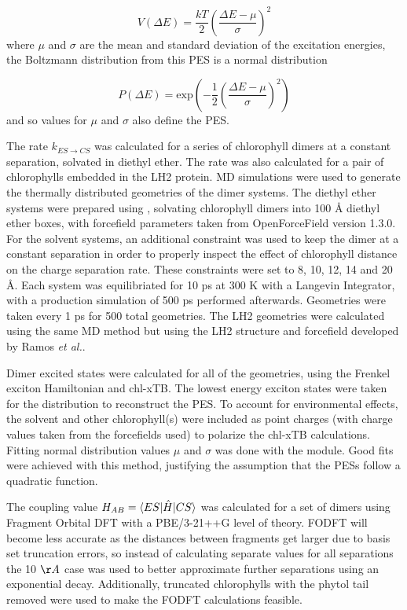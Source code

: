 \begin{equation}
    V\left(\Delta E\right) = \frac{kT}{2} \left( \frac{\Delta E - \mu}{\sigma}\right)^2
\end{equation}
%
where $\mu$ and $\sigma$ are the mean and standard deviation of the excitation energies,
the Boltzmann distribution from this PES is a normal distribution

\begin{equation}
    P\left(\Delta E\right) = \text{exp} \left(-\frac{1}{2}\left(\frac{\Delta E - \mu}{\sigma}\right)^2\right)
\end{equation}
%
and so values for $\mu$ and $\sigma$ also define the PES. 

The rate $k_{ES \rightarrow CS}$ was calculated for a series of chlorophyll dimers 
at a constant separation, solvated in diethyl ether. The rate was also calculated 
for a pair of chlorophylls embedded in the LH2 protein. MD simulations were used 
to generate  the thermally distributed geometries of the dimer systems. The diethyl
ether systems were prepared using , solvating chlorophyll dimers into 
100 \AA{} diethyl ether boxes, with forcefield parameters taken from OpenForceField 
version 1.3.0. For the solvent systems, an additional constraint was used to keep 
the dimer at a constant separation in order to properly inspect the effect of chlorophyll
distance on the charge separation rate. These constraints were set to 8, 10, 12,
14 and 20 \AA{}. Each system was equilibriated for 10 ps at 300 K with a
Langevin Integrator, with a production simulation of 500 ps performed afterwards. 
Geometries were taken every 1 ps for 500 total geometries. The LH2 geometries were
calculated using the same MD method but using the LH2 structure and forcefield developed
by Ramos \emph{et al.}.

Dimer excited states were calculated for all of the geometries, using the Frenkel
exciton Hamiltonian and chl-xTB. The lowest energy exciton states were taken for 
the distribution to reconstruct the PES. To account for environmental effects, the
solvent and other chlorophyll(s) were included as point charges (with charge values 
taken from the forcefields used) to polarize the chl-xTB calculations. Fitting normal
distribution values $\mu$ and $\sigma$ was done with the  module.
Good fits were achieved with this method, justifying the assumption that the PESs
follow a quadratic function.

The coupling value $H_{AB} = \braket{ES|\hat{H}|CS}$ was calculated for a set of
dimers using Fragment Orbital DFT with a PBE/3-21++G level of theory. FODFT will
become less accurate as the distances between fragments get larger due to basis
set truncation errors, so instead of calculating separate values for all separations
the 10 $\AA{}$ case was used to better approximate further separations using an
exponential decay. Additionally, truncated chlorophylls with the phytol tail removed
were used to make the FODFT calculations feasible.

